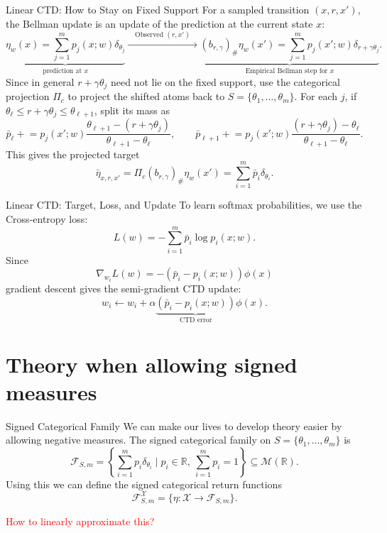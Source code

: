 \documentclass[10pt]{beamer}
\newcommand{\R}{\mathbb{R}}
\newcommand{\X}{\mathcal{X}}
\newcommand{\F}{\mathcal{F}}
\newcommand{\1}{\mathds{1}}
\begin{document}
\begin{frame}{Linear CTD: How to Stay on Fixed Support}
  \small
  For a sampled transition $(x,r,x')$, the Bellman update is an update
  of the prediction at the current state $x$:
  \[
    \underbrace{
    \eta_w(x)
    =
    \sum_{j=1}^m p_j(x;w)\delta_{\theta_j}
    }_{\text{prediction at }x}
    \xrightarrow{\quad \text{Observed }(r,x')\quad}
    \underbrace{
    (b_{r,\gamma})_\#\eta_w(x')
    =
    \sum_{j=1}^m p_j(x';w)\delta_{r+\gamma\theta_j}
    }_{\text{Empirical Bellman step for }x}.
  \]
  Since in general $r+\gamma\theta_j$ need not lie on the fixed support, use
  the categorical projection $\Pi_c$ to project the shifted atoms back to 
  $S=\{\theta_1,\ldots,\theta_m\}$.
  For each $j$,
  if $\theta_\ell\le r+\gamma\theta_j\le\theta_{\ell+1}$, split its mass as
  \[
    \bar p_\ell \mathrel{+}=
    p_j(x';w)\frac{\theta_{\ell+1}-(r+\gamma\theta_j)}
    {\theta_{\ell+1}-\theta_\ell},
    \qquad
    \bar p_{\ell+1} \mathrel{+}=
    p_j(x';w)\frac{(r+\gamma\theta_j)-\theta_\ell}
    {\theta_{\ell+1}-\theta_\ell}.
  \]
  This gives the projected target
   \[
    \bar\eta_{x,r,x'}
    =
    \Pi_c(b_{r,\gamma})_\#\eta_w(x')
    =\sum_{i=1}^m\bar p_i\delta_{\theta_i}.
  \]
\end{frame}

\begin{frame}{Linear CTD: Target, Loss, and Update}
  To learn softmax probabilities, we use the Cross-entropy loss:
  \[
    L(w)=-\sum_{i=1}^m\bar p_i\log p_i(x;w).
  \]
  Since
  \[
    \nabla_{w_i} L(w)
    =
    - (\bar{p}_i - p_i(x;w)) \phi(x)
  \]
  gradient descent gives the semi-gradient CTD update:
  \[
    w_i\leftarrow w_i+\alpha
    \underbrace{(\bar p_i-p_i(x;w))}_{\text{CTD error}}\phi(x).
  \]
\end{frame}

\section{Theory when allowing signed measures}

\begin{frame}{Signed Categorical Family}
  We can make our lives to develop theory easier by allowing negative measures. 
  The signed categorical family on $S = \{\theta_1,\ldots,\theta_m\}$ is
  \[
    \F_{S,m}
    =
    \left\{
      \sum_{i=1}^m p_i\delta_{\theta_i}
      \mid p_i\in\R,\ \sum_{i=1}^m p_i=1
    \right\} \subseteq \mathcal M(\R).
  \]
  Using this we can define the signed categorical return functions
  \[
    \F_{S,m}^{\X}=\{\eta:\X\to\F_{S,m}\}.
  \]
  \pause
  \begin{center}
      \textcolor{red}{How to linearly approximate this?}
     \end{center}

\end{frame}
\end{document}
